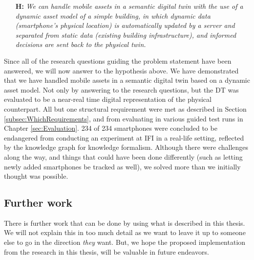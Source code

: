 \documentclass{article}
\begin{document}
\begin{itemize}
    \item[\textbf{H:}] \emph{We can handle mobile assets in a semantic digital twin with the use of a dynamic asset model of a simple building, in which dynamic data (smartphone's physical location) is automatically updated by a server and separated from static data (existing building infrastructure), and informed decisions are sent back to the physical twin.}
\end{itemize}
Since all of the research questions guiding the problem statement have been answered, we will now answer to the hypothesis above. We have demonstrated that we have handled mobile assets in a semantic digital twin based on a dynamic asset model. Not only by answering to the research questions, but the DT was evaluated to be a near-real time digital representation of the physical counterpart. All but one structural requirement were met as described in Section \ref{subsec:WhichRequirements}, and from evaluating in various guided test runs in Chapter \ref{sec:Evaluation}. 234 of 234 smartphones were concluded to be endangered from conducting an experiment at IFI in a real-life setting, reflected by the knowledge graph for knowledge formalism. Although there were challenges along the way, and things that could have been done differently (such as letting newly added smartphones be tracked as well), we solved more than we initially thought was possible.


\subsection{Further work}
There is further work that can be done by using what is described in this thesis. We will not explain this in too much detail as we want to leave it up to someone else to go in the direction \emph{they} want. But, we hope the proposed implementation from the research in this thesis, will be valuable in future endeavors.
\end{document}
